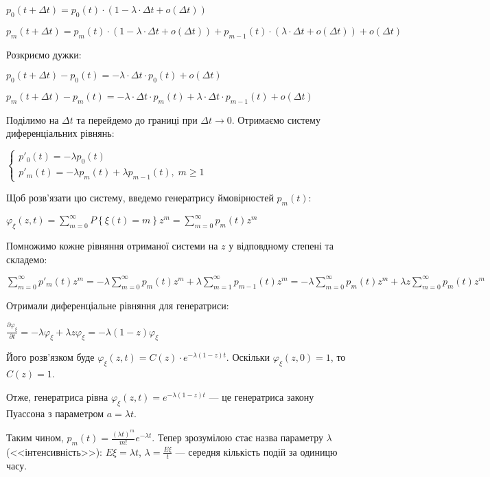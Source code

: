 $p_0(t+\Delta t) = p_0(t) \cdot (1 - \lambda \cdot \Delta t + o(\Delta t))$

$p_m(t+\Delta t) = p_m(t) \cdot (1 - \lambda \cdot \Delta t + o(\Delta t)) + p_{m-1}(t) \cdot (\lambda \cdot \Delta t + o(\Delta t)) + o(\Delta t)$

\noindent Розкриємо дужки:

$p_0(t+\Delta t) - p_0(t) = -\lambda \cdot \Delta t \cdot p_0(t) + o(\Delta t)$
\nopagebreak

$p_m(t+\Delta t) - p_m(t) = -\lambda \cdot \Delta t \cdot p_m(t) + \lambda\cdot\Delta t \cdot p_{m-1}(t) + o(\Delta t)$

\noindent Поділимо на $\Delta t$ та перейдемо до границі при $\Delta t \rightarrow 0$.
Отримаємо систему диференціальних рівнянь:

$\begin{cases}
    p'_0(t) = - \lambda p_0(t) \\
    p'_m(t) = - \lambda p_m(t) + \lambda p_{m-1}(t), \; m \geq 1
\end{cases}$

\noindent Щоб розв'язати цю систему, введемо генератрису ймовірностей $p_m(t)$:

$\varphi_\xi(z, t) = \sum\limits_{m=0}^{\infty} P\left\{\xi(t) = m\right\} z^m = \sum\limits_{m=0}^{\infty} p_m(t) z^m$ 

\noindent Помножимо кожне рівняння отриманої системи на $z$ у відповдному степені та складемо:

$\sum\limits_{m=0}^{\infty} p'_m(t) z^m = -\lambda \sum\limits_{m=0}^{\infty} p_m(t) z^m + \lambda \sum\limits_{m=1}^{\infty} p_{m-1}(t) z^m = 
-\lambda \sum\limits_{m=0}^{\infty} p_m(t) z^m + \lambda z \sum\limits_{m=0}^{\infty} p_{m}(t) z^m$

\noindent Отримали диференціальне рівняння для генератриси:

$\frac{\partial \varphi_\xi}{\partial t} = - \lambda \varphi_\xi + \lambda z \varphi_\xi = -\lambda(1-z) \varphi_\xi$

\noindent Його розв'язком буде $\varphi_\xi(z, t) = C(z) \cdot e^{-\lambda(1-z)t}$.
Оскільки $\varphi_\xi(z, 0) = 1$, то $C(z) = 1$.

Отже, генератриса рівна $\varphi_\xi(z, t) = e^{-\lambda(1-z)t}$ --- це генератриса закону Пуассона з параметром $a=\lambda t$.

Таким чином, $p_m(t) = \frac{(\lambda t)^m}{m!}e^{-\lambda t}$. 
Тепер зрозумілою стає назва параметру $\lambda$ (<<інтенсивність>>): $E\xi = \lambda t$, $\lambda = \frac{E\xi}{t}$ --- середня кількість подій за одиницю часу.

